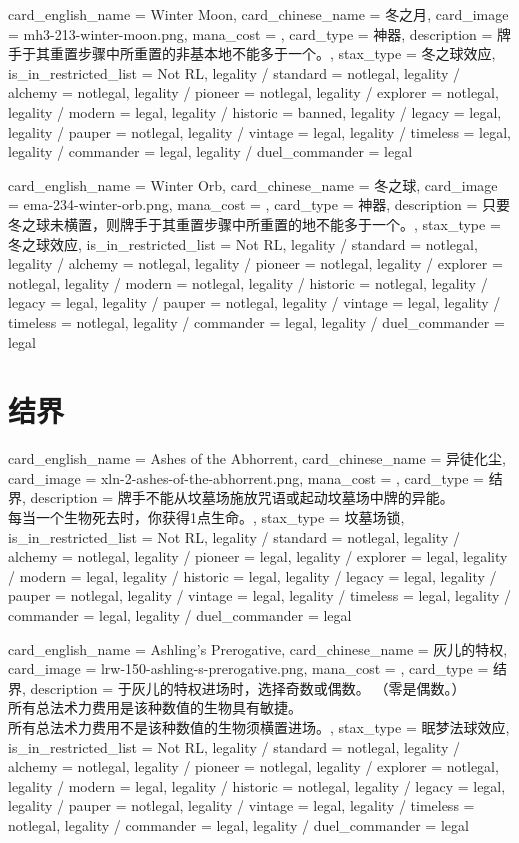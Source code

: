 \documentclass[lang = cn, color = black, 10pt]{AllThatStax}
\begin{document}
\card
{
	card_english_name = {Winter Moon},
	card_chinese_name = {冬之月},
	card_image = mh3-213-winter-moon.png,
	mana_cost = ,
	card_type = 神器,
	description = {牌手于其重置步骤中所重置的非基本地不能多于一个。},
	stax_type = 冬之球效应,
	is_in_restricted_list = Not RL,
	legality / standard = notlegal,
	legality / alchemy = notlegal,
	legality / pioneer = notlegal,
	legality / explorer = notlegal,
	legality / modern = legal,
	legality / historic = banned,
	legality / legacy = legal,
	legality / pauper = notlegal,
	legality / vintage = legal,
	legality / timeless = legal,
	legality / commander = legal,
	legality / duel_commander = legal
}

\card
{
	card_english_name = {Winter Orb},
	card_chinese_name = {冬之球},
	card_image = ema-234-winter-orb.png,
	mana_cost = ,
	card_type = 神器,
	description = {只要冬之球未横置，则牌手于其重置步骤中所重置的地不能多于一个。},
	stax_type = 冬之球效应,
	is_in_restricted_list = Not RL,
	legality / standard = notlegal,
	legality / alchemy = notlegal,
	legality / pioneer = notlegal,
	legality / explorer = notlegal,
	legality / modern = notlegal,
	legality / historic = notlegal,
	legality / legacy = legal,
	legality / pauper = notlegal,
	legality / vintage = legal,
	legality / timeless = notlegal,
	legality / commander = legal,
	legality / duel_commander = legal
}

\section{结界}

\card
{
	card_english_name = {Ashes of the Abhorrent},
	card_chinese_name = {异徒化尘},
	card_image = xln-2-ashes-of-the-abhorrent.png,
	mana_cost = ,
	card_type = 结界,
	description = {牌手不能从坟墓场施放咒语或起动坟墓场中牌的异能。\\
		每当一个生物死去时，你获得1点生命。},
	stax_type = 坟墓场锁,
	is_in_restricted_list = Not RL,
	legality / standard = notlegal,
	legality / alchemy = notlegal,
	legality / pioneer = legal,
	legality / explorer = legal,
	legality / modern = legal,
	legality / historic = legal,
	legality / legacy = legal,
	legality / pauper = notlegal,
	legality / vintage = legal,
	legality / timeless = legal,
	legality / commander = legal,
	legality / duel_commander = legal
}

\card
{
	card_english_name = {Ashling's Prerogative},
	card_chinese_name = {灰儿的特权},
	card_image = lrw-150-ashling-s-prerogative.png,
	mana_cost = ,
	card_type = 结界,
	description = {于灰儿的特权进场时，选择奇数或偶数。 （零是偶数。）\\
		所有总法术力费用是该种数值的生物具有敏捷。\\
		所有总法术力费用不是该种数值的生物须横置进场。},
	stax_type = 眠梦法球效应,
	is_in_restricted_list = Not RL,
	legality / standard = notlegal,
	legality / alchemy = notlegal,
	legality / pioneer = notlegal,
	legality / explorer = notlegal,
	legality / modern = legal,
	legality / historic = notlegal,
	legality / legacy = legal,
	legality / pauper = notlegal,
	legality / vintage = legal,
	legality / timeless = notlegal,
	legality / commander = legal,
	legality / duel_commander = legal
}
\end{document}

